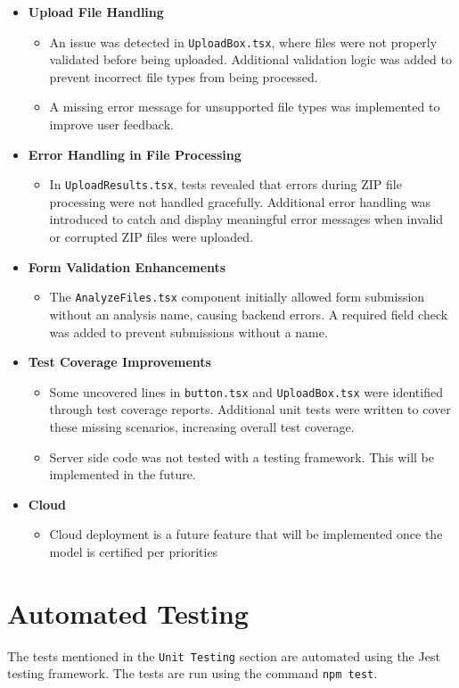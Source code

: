\documentclass[12pt, titlepage]{article}
\begin{document}
\begin{itemize}
\item \textbf{Upload File Handling}
\begin{itemize}
\item An issue was detected in \texttt{UploadBox.tsx}, where files were not properly validated before being uploaded. Additional validation logic was added to prevent incorrect file types from being processed.
\item A missing error message for unsupported file types was implemented to improve user feedback.
\end{itemize}
\item \textbf{Error Handling in File Processing}
\begin{itemize}
\item In \texttt{UploadResults.tsx}, tests revealed that errors during ZIP file processing were not handled gracefully. Additional error handling was introduced to catch and display meaningful error messages when invalid or corrupted ZIP files were uploaded.
\end{itemize}
\item \textbf{Form Validation Enhancements}
\begin{itemize}
\item The \texttt{AnalyzeFiles.tsx} component initially allowed form submission without an analysis name, causing backend errors. A required field check was added to prevent submissions without a name.
\end{itemize}
\item \textbf{Test Coverage Improvements}
\begin{itemize}
\item Some uncovered lines in \texttt{button.tsx} and \texttt{UploadBox.tsx} were identified through test coverage reports. Additional unit tests were written to cover these missing scenarios, increasing overall test coverage.
\item Server side code was not tested with a testing framework. This will be implemented in the future.
\end{itemize}
\item \textbf{Cloud}
\begin{itemize}
\item Cloud deployment is a future feature that will be implemented once the model is certified per priorities
\end{itemize}
\end{itemize}


\section{Automated Testing}
The tests mentioned in the \texttt{Unit Testing} section are automated using the Jest testing framework. The tests are run using the command \texttt{npm test}.
\end{document}
